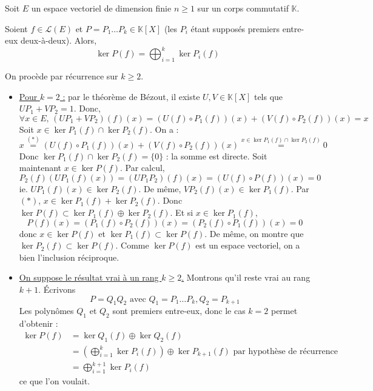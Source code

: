 




	
	Soit $E$ un espace vectoriel de dimension finie $n \geq 1$ sur un corps commutatif $\mathbb{K}$.

	\begin{lemma}
		\label{lemme-noyaux-1}
		Soient $f \in \mathcal{L}(E)$ et $P = P_1 \dots P_k \in \mathbb{K}[X]$ (les $P_i$ étant supposés premiers entre-eux deux-à-deux). Alors,
		\[ \ker{P(f)} = \bigoplus_{i = 1}^k \ker{P_i(f)} \]
	\end{lemma}

	\begin{demonstration}
		On procède par récurrence sur $k \geq 2$.
		\begin{itemize}
			\item \underline{Pour $k = 2$ :} par le théorème de Bézout, il existe $U, V \in \mathbb{K}[X]$ tels que $UP_1 + VP_2 = 1$. Donc,
			\[ \forall x \in E, \, (UP_1 + VP_2)(f)(x) = (U(f) \circ P_1(f))(x) + (V(f) \circ P_2(f))(x) = x \tag{$*$} \]
			Soit $x \in \ker{P_1(f)} \cap \ker{P_2(f)}$. On a :
			\[ x \overset{(*)}{=} (U(f) \circ P_1(f))(x) + (V(f) \circ P_2(f))(x) \overset{x \in \ker{P_1(f)} \cap \ker{P_2(f)}}{=} 0 \]
			Donc $\ker{P_1(f)} \cap \ker{P_2(f)} = \{ 0 \}$ : la somme est directe.
			\newpar
			Soit maintenant $x \in \ker{P(f)}$. Par calcul,
			\[ P_2(f)(UP_1(f)(x)) = (UP_1P_2)(f)(x) = (U(f) \circ P(f))(x) = 0 \]
			ie. $UP_1(f)(x) \in \ker{P_2(f)}$. De même, $VP_2(f)(x) \in \ker{P_1(f)}$. Par $(*)$, $x \in \ker{P_1(f)} + \ker{P_2(f)}$. Donc $\ker{P(f)} \subset \ker{P_1(f)} \oplus \ker{P_2(f)}$.
			\newpar
			Et si $x \in \ker{P_1(f)}$,
			\[ P(f)(x) = (P_1(f) \circ P_2(f))(x) = (P_2(f) \circ P_1(f))(x) = 0 \]
			donc $x \in \ker{P(f)}$ et $\ker{P_1}(f) \subset \ker{P(f)}$. De même, on montre que $\ker{P_2}(f) \subset \ker{P(f)}$. Comme $\ker{P(f)}$ est un espace vectoriel, on a bien l'inclusion réciproque.
			\item \underline{On suppose le résultat vrai à un rang $k \geq 2$.} Montrons qu'il reste vrai au rang $k+1$. Écrivons
			\[ P = Q_1Q_2 \text{ avec } Q_1 = P_1 \dots P_k, Q_2 = P_{k+1} \]
			Les polynômes $Q_1$ et $Q_2$ sont premiers entre-eux, donc le cas $k = 2$ permet d'obtenir :
			\begin{align*}
				\ker{P(f)} &= \ker{Q_1(f)} \oplus \ker{Q_2(f)} \\
				&= \left( \bigoplus_{i = 1}^k \ker{P_i(f)} \right) \oplus \ker{P_{k+1}(f)} \text{ par hypothèse de récurrence} \\
				&= \bigoplus_{i = 1}^{k+1} \ker{P_i(f)}
			\end{align*}
			ce que l'on voulait.
		\end{itemize}
	\end{demonstration}

